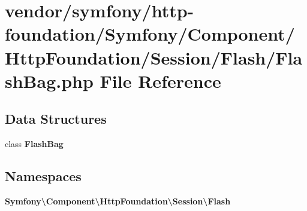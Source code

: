 \section{vendor/symfony/http-\/foundation/\+Symfony/\+Component/\+Http\+Foundation/\+Session/\+Flash/\+Flash\+Bag.php File Reference}
\label{_flash_bag_8php}
\subsection*{Data Structures}
\begin{DoxyCompactItemize}
\item 
class {\bf Flash\+Bag}
\end{DoxyCompactItemize}
\subsection*{Namespaces}
\begin{DoxyCompactItemize}
\item 
 {\bf Symfony\textbackslash{}\+Component\textbackslash{}\+Http\+Foundation\textbackslash{}\+Session\textbackslash{}\+Flash}
\end{DoxyCompactItemize}
